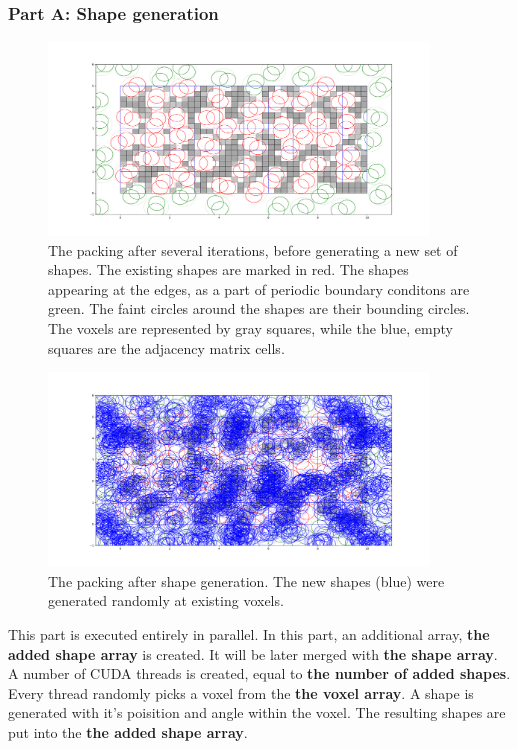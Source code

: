 \documentclass[12pt, oneside]{report}
\begin{document}
\subsubsection{Part A: Shape generation}

\begin{figure}[H]
  \centering
	\label{GPURSA_Process_1}
	\includegraphics[width=0.9\textwidth,keepaspectratio]{Images/GPURSA/Figure_1.pdf}
	\caption{The packing after several iterations, before generating a new set of shapes.\newline
	The existing shapes are marked in red. The shapes appearing at the edges, as a part of periodic boundary conditons are green. The faint circles around the shapes are their bounding circles. The voxels are represented by gray squares, while the blue, empty squares are the adjacency matrix cells.}
\end{figure}

\begin{figure}[H]
  \centering
	\label{GPURSA_Process_1}
	\includegraphics[width=0.9\textwidth,keepaspectratio]{Images/GPURSA/Figure_2.pdf}
	\caption{The packing after shape generation. The new shapes (blue) were generated randomly at existing voxels.}
\end{figure}

This part is executed entirely in parallel. \newline
In this part, an additional array, \textbf{the added shape array} is created. It will be later merged with \textbf{the shape array}. \newline
A number of CUDA threads is created, equal to \textbf{the number of added shapes}. Every thread randomly picks a voxel from the \textbf{the voxel array}. A shape is generated with it's poisition and angle within the voxel. The resulting shapes are put into the \textbf{the added shape array}.
\end{document}
